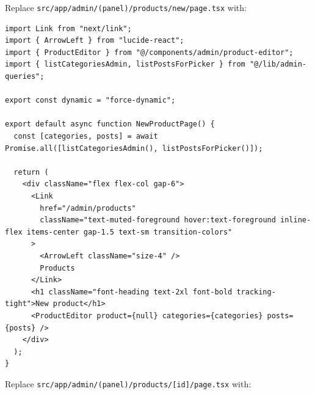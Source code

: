 \documentclass[11pt,a4paper]{article}
\begin{document}
Replace \texttt{src/app/admin/(panel)/products/new/page.tsx} with:

\begin{lstlisting}
import Link from "next/link";
import { ArrowLeft } from "lucide-react";
import { ProductEditor } from "@/components/admin/product-editor";
import { listCategoriesAdmin, listPostsForPicker } from "@/lib/admin-queries";

export const dynamic = "force-dynamic";

export default async function NewProductPage() {
  const [categories, posts] = await Promise.all([listCategoriesAdmin(), listPostsForPicker()]);

  return (
    <div className="flex flex-col gap-6">
      <Link
        href="/admin/products"
        className="text-muted-foreground hover:text-foreground inline-flex items-center gap-1.5 text-sm transition-colors"
      >
        <ArrowLeft className="size-4" />
        Products
      </Link>
      <h1 className="font-heading text-2xl font-bold tracking-tight">New product</h1>
      <ProductEditor product={null} categories={categories} posts={posts} />
    </div>
  );
}
\end{lstlisting}

Replace \texttt{src/app/admin/(panel)/products/[id]/page.tsx} with:
\end{document}
